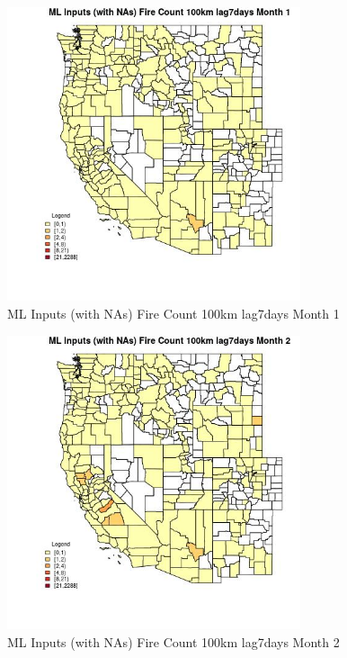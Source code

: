 \clearpage 

\begin{figure} 
\centering  
\includegraphics[width=0.77\textwidth]{Code_Outputs/Report_ML_input_PM25_Step4_part_e_de_duplicated_aves_compiled_2019-05-21wNAs_CountyFire_Count_100km_lag7daysmedianMonth1.jpg} 
\caption{\label{fig:Report_ML_input_PM25_Step4_part_e_de_duplicated_aves_compiled_2019-05-21wNAsCountyFire_Count_100km_lag7daysmedianMonth1}ML Inputs (with NAs) Fire Count 100km lag7days Month 1} 
\end{figure} 
 

\begin{figure} 
\centering  
\includegraphics[width=0.77\textwidth]{Code_Outputs/Report_ML_input_PM25_Step4_part_e_de_duplicated_aves_compiled_2019-05-21wNAs_CountyFire_Count_100km_lag7daysmedianMonth2.jpg} 
\caption{\label{fig:Report_ML_input_PM25_Step4_part_e_de_duplicated_aves_compiled_2019-05-21wNAsCountyFire_Count_100km_lag7daysmedianMonth2}ML Inputs (with NAs) Fire Count 100km lag7days Month 2} 
\end{figure} 
 

